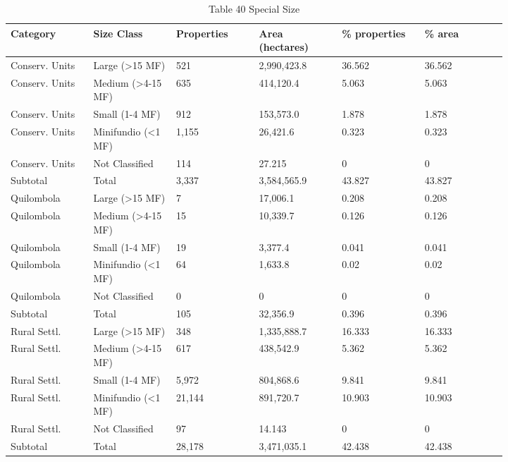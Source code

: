 \documentclass[12pt]{article}
\begin{document}
\begin{table}[H]
\centering
\caption{Table 40 Special Size}
{\fontsize{12}{14}\selectfont
\setlength{\tabcolsep}{3pt}
\renewcommand{\arraystretch}{1.08}
\begin{tabular}{p{0.137\linewidth}p{0.137\linewidth}p{0.137\linewidth}p{0.137\linewidth}p{0.137\linewidth}p{0.137\linewidth}}
\toprule
Category & Size Class & Properties & Area (hectares) & \% properties & \% area \\
\midrule
Conserv. Units & Large (>15 MF) & 521 & 2,990,423.8 & 36.562 & 36.562 \\
Conserv. Units & Medium (>4-15 MF) & 635 & 414,120.4 & 5.063 & 5.063 \\
Conserv. Units & Small (1-4 MF) & 912 & 153,573.0 & 1.878 & 1.878 \\
Conserv. Units & Minifundio (<1 MF) & 1,155 & 26,421.6 & 0.323 & 0.323 \\
Conserv. Units & Not Classified & 114 & 27.215 & 0 & 0 \\
Subtotal & Total & 3,337 & 3,584,565.9 & 43.827 & 43.827 \\
Quilombola & Large (>15 MF) & 7 & 17,006.1 & 0.208 & 0.208 \\
Quilombola & Medium (>4-15 MF) & 15 & 10,339.7 & 0.126 & 0.126 \\
Quilombola & Small (1-4 MF) & 19 & 3,377.4 & 0.041 & 0.041 \\
Quilombola & Minifundio (<1 MF) & 64 & 1,633.8 & 0.02 & 0.02 \\
Quilombola & Not Classified & 0 & 0 & 0 & 0 \\
Subtotal & Total & 105 & 32,356.9 & 0.396 & 0.396 \\
Rural Settl. & Large (>15 MF) & 348 & 1,335,888.7 & 16.333 & 16.333 \\
Rural Settl. & Medium (>4-15 MF) & 617 & 438,542.9 & 5.362 & 5.362 \\
Rural Settl. & Small (1-4 MF) & 5,972 & 804,868.6 & 9.841 & 9.841 \\
Rural Settl. & Minifundio (<1 MF) & 21,144 & 891,720.7 & 10.903 & 10.903 \\
Rural Settl. & Not Classified & 97 & 14.143 & 0 & 0 \\
Subtotal & Total & 28,178 & 3,471,035.1 & 42.438 & 42.438 \\
\bottomrule
\end{tabular}
}
\end{table}
\end{document}
